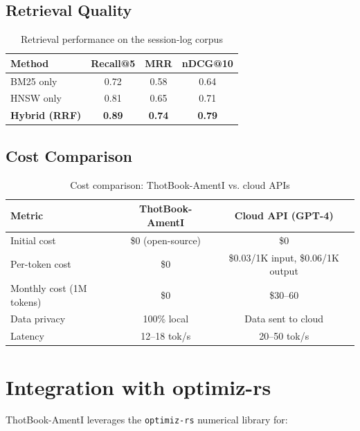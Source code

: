 \documentclass[11pt,a4paper]{article}
\theoremstyle{plain}
\theoremstyle{definition}
\begin{document}
\subsection{Retrieval Quality}

\begin{table}[h]
\centering
\caption{Retrieval performance on the session-log corpus}
\begin{tabular}{lccc}
\toprule
\textbf{Method} & \textbf{Recall@5} & \textbf{MRR} & \textbf{nDCG@10} \\
\midrule
BM25 only & 0.72 & 0.58 & 0.64 \\
HNSW only & 0.81 & 0.65 & 0.71 \\
\textbf{Hybrid (RRF)} & \textbf{0.89} & \textbf{0.74} & \textbf{0.79} \\
\bottomrule
\end{tabular}
\label{tab:retrieval}
\end{table}

\subsection{Cost Comparison}

\begin{table}[h]
\centering
\caption{Cost comparison: ThotBook-AmentI vs. cloud APIs}
\begin{tabular}{lcc}
\toprule
\textbf{Metric} & \textbf{ThotBook-AmentI} & \textbf{Cloud API (GPT-4)} \\
\midrule
Initial cost & \$0 (open-source) & \$0 \\
Per-token cost & \$0 & \$0.03/1K input, \$0.06/1K output \\
Monthly cost (1M tokens) & \$0 & \$30--60 \\
Data privacy & 100\% local & Data sent to cloud \\
Latency & 12--18 tok/s & 20--50 tok/s \\
\bottomrule
\end{tabular}
\label{tab:cost}
\end{table}

\section{Integration with optimiz-rs}
\label{sec:optimizrs}

ThotBook-AmentI leverages the \texttt{optimiz-rs} numerical library for:
\end{document}
